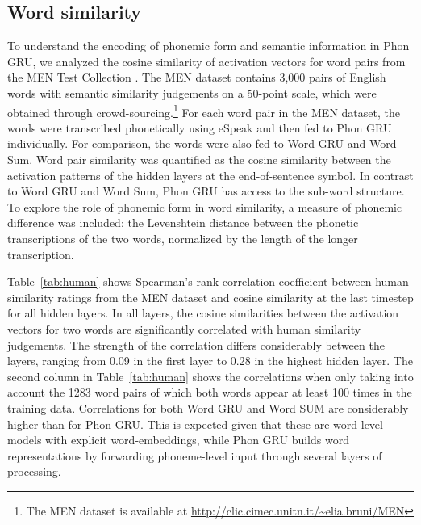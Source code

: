 \subsection{Word similarity}
To understand the encoding of phonemic form and semantic information in {\sc Phon GRU}, we analyzed the cosine similarity of activation vectors for word pairs from the MEN Test Collection \cite{bruni2014multimodal}. The MEN dataset contains 3,000 pairs of English words with semantic similarity judgements on a 50-point scale, which were obtained through crowd-sourcing.\footnote{The MEN dataset is available at \url{http://clic.cimec.unitn.it/~elia.bruni/MEN}}
For each word pair in the MEN dataset, the words were transcribed phonetically using eSpeak and then fed to {\sc Phon GRU} individually. For comparison, the words were also fed to {\sc Word GRU} and {\sc Word Sum}. Word pair similarity was quantified as the cosine similarity between the activation patterns of the hidden layers at the end-of-sentence symbol.
In contrast to {\sc Word GRU} and {\sc Word Sum}, {\sc Phon GRU} has access to the sub-word structure. To explore the role of phonemic form in word similarity, a measure of phonemic difference was included: the Levenshtein distance between the phonetic transcriptions of the two words, normalized by the length of the longer transcription. 

Table~\ref{tab:human} shows Spearman's rank correlation coefficient between human similarity ratings from the MEN dataset and cosine similarity at the last timestep for all hidden layers. In all layers, the cosine similarities between the activation vectors for two words are significantly correlated with human similarity judgements. The strength of the correlation differs considerably between the layers, ranging from 0.09 in the first layer to 0.28 in the highest hidden layer. The second column in Table~\ref{tab:human} shows the correlations when only taking into account the 1283 word pairs of which both words appear at least 100 times in the training data. 
Correlations for both {\sc Word GRU} and {\sc Word SUM} are considerably higher than for {\sc Phon GRU}. This is expected given that these are word level models with explicit word-embeddings, while {\sc Phon GRU} builds word representations by forwarding phoneme-level input through several layers of processing.

